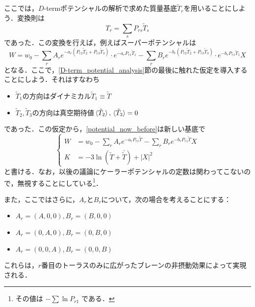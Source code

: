 \documentclass[a4paper,uplatex,dvipdfmx]{jsarticle}
\theoremstyle{definition}
\begin{document}
ここでは，$D$-termポテンシャルの解析で求めた質量基底$\tilde{T}_{r}$を用いることにしよう．変換則は
\begin{equation}
   T_{r}
   =
   \sum_{s}P_{rs}\tilde{T}_{s}
   \nonumber
\end{equation}
であった．この変換を行えば，例えばスーパーポテンシャルは
\begin{equation}
   W
   =
   w_{0}
   -
   \sum_{r}
   A_{r}e^{-a_{r}(P_{r2}\tilde{T}_{2}+P_{r3}\tilde{T}_{3})}
   \cdot
   e^{-a_{r}P_{r1}\tilde{T}_{1}}
   -
   \sum_{r}
   B_{r}e^{-b_{r}(P_{r2}\tilde{T}_{2}+P_{r3}\tilde{T}_{3})}
   \cdot
   e^{-b_{r}P_{r1}\tilde{T}_{1}}
   X
   \nonumber
\end{equation}
となる．ここで，\ref{D-term_potential_analysis}節の最後に触れた仮定を導入することにしよう．それはすなわち
\begin{itemize}
   \item 
   $\tilde{T}_1$の方向はダイナミカル$\tilde{T}_{1}\equiv\tilde{T}$
   \item 
   $\tilde{T}_{2},\tilde{T}_{3}$の方向は真空期待値$\ev*{\tilde{T}_{2}},\ev*{\tilde{T}_{3}}=0$
\end{itemize}   
であった．この仮定から，\eqref{potential_now_before}は新しい基底で
\begin{equation}
   \left\{
      \begin{alignedat}{1}
         W
         &=w_{0}
         -
         \sum_{r}
         A_{r}
         e^{-a_{r}P_{r1}\tilde{T}}
         -
         \sum_{r}
         B_{r}
         e^{-b_{r}P_{r1}\tilde{T}}
         X
         \\
         K
         &=
         -
         3\ln(\tilde{T}+\bar{\tilde{T}})
         +
         |X|^2
      \end{alignedat}
   \right.
   \label{potential_now_after}
\end{equation}
と書ける．なお，以後の議論にケーラーポテンシャルの定数は関わってこないので，無視することにしている\footnote{
   その値は
   $
      -\sum\ln P_{r1}
   $
   である．
}．

また，ここではさらに，$A_{r}$と$B_{r}$について，次の場合を考えることにする：
\begin{itemize}
   \item 
   $A_{r}=(A,0,0),B_{r}=(B,0,0)$
   \item 
   $A_{r}=(0,A,0),B_{r}=(0,B,0)$
   \item 
   $A_{r}=(0,0,A),B_{r}=(0,0,B)$
\end{itemize}
これらは，$r$番目のトーラスのみに広がったブレーンの非摂動効果によって実現される\cite{Dine_SupersymmetryString_2023}．
\end{document}
